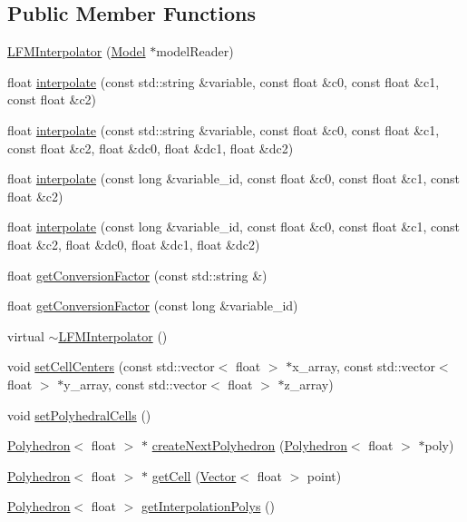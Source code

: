 \subsection*{Public Member Functions}
\begin{DoxyCompactItemize}
\item 
\hyperlink{classccmc_1_1_l_f_m_interpolator_a04218c8ff9c0a3703cd3d9cc870dfd4a}{L\-F\-M\-Interpolator} (\hyperlink{classccmc_1_1_model}{Model} $\ast$model\-Reader)
\item 
float \hyperlink{classccmc_1_1_l_f_m_interpolator_a1d6356a51024075b873e7966abd418f0}{interpolate} (const std\-::string \&variable, const float \&c0, const float \&c1, const float \&c2)
\item 
float \hyperlink{classccmc_1_1_l_f_m_interpolator_ab895be1e681fc9af63d9ae8916660077}{interpolate} (const std\-::string \&variable, const float \&c0, const float \&c1, const float \&c2, float \&dc0, float \&dc1, float \&dc2)
\item 
float \hyperlink{classccmc_1_1_l_f_m_interpolator_a022c2cc8c060c912bc9e07d9b05804d9}{interpolate} (const long \&variable\-\_\-id, const float \&c0, const float \&c1, const float \&c2)
\item 
float \hyperlink{classccmc_1_1_l_f_m_interpolator_aafa40bcb1aae6e232bc9b883cc8df160}{interpolate} (const long \&variable\-\_\-id, const float \&c0, const float \&c1, const float \&c2, float \&dc0, float \&dc1, float \&dc2)
\item 
float \hyperlink{classccmc_1_1_l_f_m_interpolator_aeb1ac07b468b3b046ddd4150f9a38426}{get\-Conversion\-Factor} (const std\-::string \&)
\item 
float \hyperlink{classccmc_1_1_l_f_m_interpolator_a4b5c75b22aefefbc7a68d8398776f3bc}{get\-Conversion\-Factor} (const long \&variable\-\_\-id)
\item 
virtual \hyperlink{classccmc_1_1_l_f_m_interpolator_a77c25b31fb9fa25752a7337cbfde0a77}{$\sim$\-L\-F\-M\-Interpolator} ()
\item 
void \hyperlink{classccmc_1_1_l_f_m_interpolator_a7cc7863edac1024b645e199058ad0d80}{set\-Cell\-Centers} (const std\-::vector$<$ float $>$ $\ast$x\-\_\-array, const std\-::vector$<$ float $>$ $\ast$y\-\_\-array, const std\-::vector$<$ float $>$ $\ast$z\-\_\-array)
\item 
void \hyperlink{classccmc_1_1_l_f_m_interpolator_a74c1ba35f8eaece3f44393538c23300d}{set\-Polyhedral\-Cells} ()
\item 
\hyperlink{classccmc_1_1_polyhedron}{Polyhedron}$<$ float $>$ $\ast$ \hyperlink{classccmc_1_1_l_f_m_interpolator_afbbebbeee5068e425c2deede2a30ebfc}{create\-Next\-Polyhedron} (\hyperlink{classccmc_1_1_polyhedron}{Polyhedron}$<$ float $>$ $\ast$poly)
\item 
\hyperlink{classccmc_1_1_polyhedron}{Polyhedron}$<$ float $>$ $\ast$ \hyperlink{classccmc_1_1_l_f_m_interpolator_a872043562f23728bbf389cfafb004a6f}{get\-Cell} (\hyperlink{classccmc_1_1_vector}{Vector}$<$ float $>$ point)
\item 
\hyperlink{classccmc_1_1_polyhedron}{Polyhedron}$<$ float $>$ \hyperlink{classccmc_1_1_l_f_m_interpolator_a79926d3a8332d055bd60eb006f943f0a}{get\-Interpolation\-Polys} ()
\end{DoxyCompactItemize}
